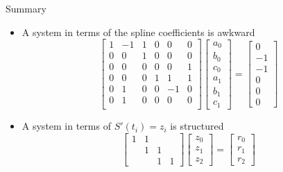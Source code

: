 \documentclass[10pt]{beamer}
\begin{document}
\begin{frame}[shrink]{Summary}
\begin{itemize}
    \item A system in terms of the spline coefficients is awkward
        $$
    \begin{bmatrix}
        1 & -1 & 1 & 0 & 0 &0\\
        0 & 0 & 1 & 0 & 0 & 0\\
        0 & 0 & 0 & 0 & 0 & 1\\
        0 & 0 & 0 & 1 & 1 & 1\\
        0 & 1 & 0 & 0 & -1 & 0\\
        0 & 1 & 0 & 0 & 0 & 0\\
    \end{bmatrix}\begin{bmatrix}
        a_0\\b_0\\c_0\\a_1\\b_1\\c_1
    \end{bmatrix}=\begin{bmatrix}
        0\\-1\\-1\\0\\0\\0
    \end{bmatrix}
    $$
    \item A system in terms of  $S'(t_i)=z_i$ is structured 
    $$
    \begin{bmatrix}
        1 &1 & & \\
          &1 &1& \\
          & & 1&    1
    \end{bmatrix}\begin{bmatrix}
        z_0\\z_1\\z_2
    \end{bmatrix} = \begin{bmatrix}
        r_0\\r_1\\r_2
    \end{bmatrix}
    $$
\end{itemize}
\end{frame}
\end{document}
